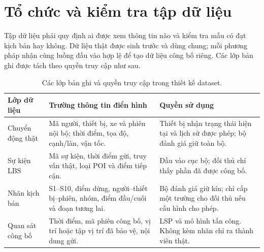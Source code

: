 \documentclass[12pt,a4paper,oneside]{report}
\begin{document}
\clearpage
\section{Tổ chức và kiểm tra tập dữ liệu}

Tập dữ liệu phải quy định ai được xem thông tin nào và kiểm tra mẫu có đạt kịch bản hay không. Dữ liệu thật được sinh trước và dùng chung; mỗi phương pháp nhận cùng luồng đầu vào hợp lệ để tạo dữ liệu công bố riêng. Các lớp bản ghi được tách theo quyền truy cập như sau.

\begingroup{}
\begin{table}[htbp]
\centering\small
\caption{Các lớp bản ghi và quyền truy cập trong thiết kế dataset.}
\label{tab:dataset-records}
\begin{tabularx}{\textwidth}{P{3.0cm}Y Y}
\toprule
\textbf{Lớp dữ liệu} & \textbf{Trường thông tin điển hình} & \textbf{Quyền sử dụng}\\
\midrule
Chuyển động thật & Mã người, thiết bị, xe và phiên nội bộ; thời điểm, tọa độ, cạnh/làn, vận tốc. & Thiết bị nhận trạng thái hiện tại và lịch sử được phép; bộ đánh giá giữ toàn bộ.\\
\addlinespace
Sự kiện LBS & Mã sự kiện, thời điểm gửi, truy vấn thật, loại POI và điểm tiếp cận. & Đầu vào cục bộ; đối thủ chỉ thấy phần đã được công bố.\\
\addlinespace
Nhãn kịch bản & S1--S10, điểm dừng, người--thiết bị--phiên, nhóm, điểm đầu/cuối và đoạn tương lai. & Bộ đánh giá giữ kín; chỉ cấp một trường cho đối thủ nếu cấu hình cho phép.\\
\addlinespace
Quan sát công bố & Thời điểm, mã phiên công bố, vị trí hoặc tập vị trí đã bảo vệ, nội dung gửi. & LSP và mô hình tấn công. Không kèm nhãn chỉ ra thành viên thật.\\
\bottomrule
\end{tabularx}
\end{table}
\endgroup
\end{document}
